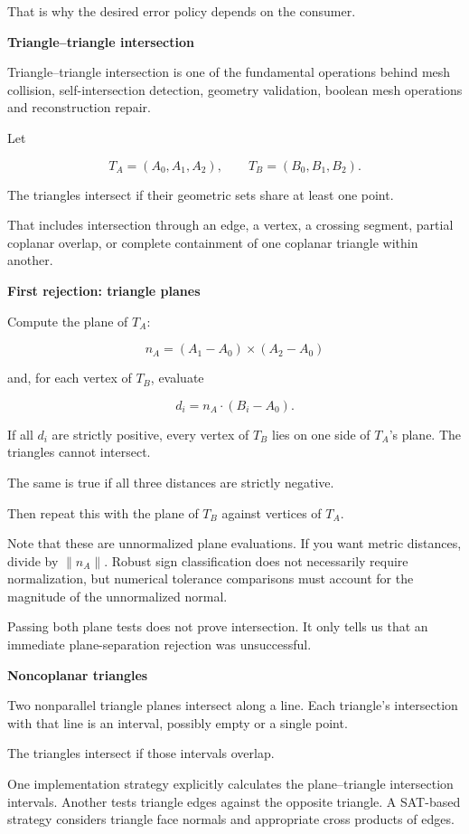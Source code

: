 That is why the desired error policy depends on the consumer.

\textbf{Triangle--triangle intersection}

Triangle--triangle intersection is one of the fundamental operations behind mesh collision, self-intersection detection, geometry validation, boolean mesh operations and reconstruction repair.

Let

\[
T_A=(A_0,A_1,A_2),\qquad T_B=(B_0,B_1,B_2).
\]

The triangles intersect if their geometric sets share at least one point.

That includes intersection through an edge, a vertex, a crossing segment, partial coplanar overlap, or complete containment of one coplanar triangle within another.

\textbf{First rejection: triangle planes}

Compute the plane of \(T_A\):

\[
n_A=(A_1-A_0)\times(A_2-A_0)
\]

and, for each vertex of \(T_B\), evaluate

\[
d_i=n_A\cdot(B_i-A_0).
\]

If all \(d_i\) are strictly positive, every vertex of \(T_B\) lies on one side of \(T_A\)'s plane. The triangles cannot intersect.

The same is true if all three distances are strictly negative.

Then repeat this with the plane of \(T_B\) against vertices of \(T_A\).

Note that these are unnormalized plane evaluations. If you want metric distances, divide by \(\|n_A\|\). Robust sign classification does not necessarily require normalization, but numerical tolerance comparisons must account for the magnitude of the unnormalized normal.

Passing both plane tests does not prove intersection. It only tells us that an immediate plane-separation rejection was unsuccessful.

\textbf{Noncoplanar triangles}

Two nonparallel triangle planes intersect along a line. Each triangle's intersection with that line is an interval, possibly empty or a single point.

The triangles intersect if those intervals overlap.

One implementation strategy explicitly calculates the plane--triangle intersection intervals. Another tests triangle edges against the opposite triangle. A SAT-based strategy considers triangle face normals and appropriate cross products of edges.

